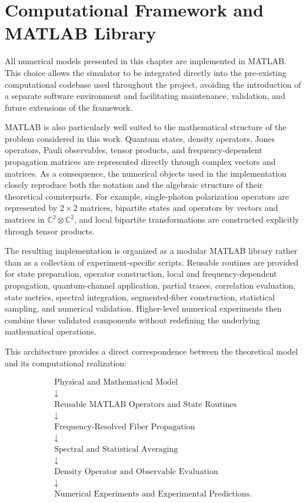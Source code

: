 
\section{Computational Framework and MATLAB Library}
\label{sec:computational_framework_matlab}

All numerical models presented in this chapter are implemented in MATLAB. This
choice allows the simulator to be integrated directly into the pre-existing
computational codebase used throughout the project, avoiding the introduction of a
separate software environment and facilitating maintenance, validation, and future
extensions of the framework.

MATLAB is also particularly well suited to the mathematical structure of the
problem considered in this work. Quantum states, density operators, Jones
operators, Pauli observables, tensor products, and frequency-dependent propagation
matrices are represented directly through complex vectors and matrices. As a
consequence, the numerical objects used in the implementation closely reproduce
both the notation and the algebraic structure of their theoretical counterparts.
For example, single-photon polarization operators are represented by
\(2\times2\) matrices, bipartite states and operators by vectors and matrices in
\(\mathbb{C}^{2}\otimes\mathbb{C}^{2}\), and local bipartite transformations are
constructed explicitly through tensor products.

The resulting implementation is organized as a modular MATLAB library rather than
as a collection of experiment-specific scripts. Reusable routines are provided for
state preparation, operator construction, local and frequency-dependent
propagation, quantum-channel application, partial traces, correlation evaluation,
state metrics, spectral integration, segmented-fiber construction, statistical
sampling, and numerical validation. Higher-level numerical experiments then
combine these validated components without redefining the underlying mathematical
operations.

This architecture provides a direct correspondence between the theoretical model
and its computational realization:

\[
\begin{array}{c}
\text{Physical and Mathematical Model}
\\
\downarrow
\\
\text{Reusable MATLAB Operators and State Routines}
\\
\downarrow
\\
\text{Frequency-Resolved Fiber Propagation}
\\
\downarrow
\\
\text{Spectral and Statistical Averaging}
\\
\downarrow
\\
\text{Density Operator and Observable Evaluation}
\\
\downarrow
\\
\text{Numerical Experiments and Experimental Predictions}.
\end{array}
\]

